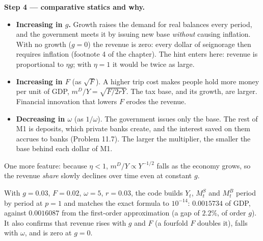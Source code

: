 \documentclass[12pt, letterpaper]{article}
\newcommand{\mD}{m^{D}}
\newcommand{\Ms}{M^{S}}
\newcommand{\MBase}{M^{B}}
\begin{document}
\begin{tcolorbox}[oddbox,title={Problem 11.3 \quad Seignorage with Zero Inflation and Growth}]
\textbf{Step 4 --- comparative statics and why.}
\begin{itemize}
\item \textbf{Increasing in $g$.} Growth raises the demand for real balances every period, and
the government meets it by issuing new base \emph{without} causing inflation. With no growth
($g=0$) the revenue is zero: every dollar of seignorage then requires inflation (footnote 4 of
the chapter). The hint enters here: revenue is proportional to $\eta g$; with $\eta=1$ it would be
twice as large.
\item \textbf{Increasing in $F$} (as $\sqrt F$). A higher trip cost makes people hold more money
per unit of GDP, $\mD/Y=\sqrt{F/2rY}$. The tax base, and its growth, are larger. Financial
innovation that lowers $F$ erodes the revenue.
\item \textbf{Decreasing in $\omega$} (as $1/\omega$). The government issues only the base. The
rest of M1 is deposits, which private banks create, and the interest saved on them accrues to
banks (Problem 11.7). The larger the multiplier, the smaller the base behind each dollar of M1.
\end{itemize}
One more feature: because $\eta<1$, $\mD/Y\propto Y^{-1/2}$ falls as the economy grows, so the
revenue \emph{share} slowly declines over time even at constant $g$.

\begin{tcolorbox}[databox]
With $g=0.03$, $F=0.02$, $\omega=5$, $r=0.03$, the code builds $Y_t$, $\Ms_t$ and $\MBase_t$
period by period at $p=1$ and matches the exact formula to $10^{-14}$: $0.0015734$ of GDP,
against $0.0016087$ from the first-order approximation (a gap of $2.2\%$, of order $g$). It
also confirms that revenue rises with $g$ and $F$ (a fourfold $F$ doubles it), falls with
$\omega$, and is zero at $g=0$.
\end{tcolorbox}
\end{tcolorbox}
\end{document}
